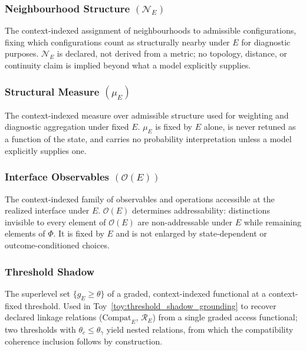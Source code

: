 \documentclass[aps,prx,onecolumn,11pt]{revtex4-2}
\theoremstyle{plain}
\theoremstyle{definition}
\theoremstyle{remark}
\begin{document}
\subsubsection*{Neighbourhood Structure \((\mathcal N_E)\)}
\label{gloss:neighbourhood}

The context-indexed assignment of neighbourhoods to admissible
configurations, fixing which configurations count as structurally
nearby under \(E\) for diagnostic purposes. \(\mathcal N_E\) is
declared, not derived from a metric; no topology, distance, or
continuity claim is implied beyond what a model explicitly supplies.

\subsubsection*{Structural Measure \((\mu_E)\)}
\label{gloss:measure}

The context-indexed measure over admissible structure used for
weighting and diagnostic aggregation under fixed \(E\). \(\mu_E\) is
fixed by \(E\) alone, is never retuned as a function of the state, and
carries no probability interpretation unless a model explicitly
supplies one.

\subsubsection*{Interface Observables \((\mathcal O(E))\)}
\label{gloss:interface_observables}

The context-indexed family of observables and operations accessible at
the realized interface under \(E\). \(\mathcal O(E)\) determines
addressability: distinctions invisible to every element of
\(\mathcal O(E)\) are non-addressable under \(E\) while remaining
elements of \(\Phi\). It is fixed by \(E\) and is not enlarged by
state-dependent or outcome-conditioned choices.

\subsubsection*{Threshold Shadow}
\label{gloss:threshold_shadow}

The superlevel set \(\{g_E\ge\theta\}\) of a graded, context-indexed
functional at a context-fixed threshold. Used in
Toy~\ref{toy:threshold_shadow_grounding} to recover declared linkage
relations (\(\mathrm{Compat}_E\), \(\mathcal R_E\)) from a single
graded access functional; two thresholds with
\(\theta_c\le\theta_\gamma\) yield nested relations, from which the
compatibility coherence inclusion follows by construction.
\end{document}
